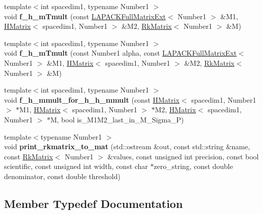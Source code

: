 \begin{DoxyCompactItemize}
\item 
\mbox{\label{classRkMatrix_a439a1469e55ddc97987ee592b920cedb}} 
{\footnotesize template$<$int spacedim1, typename Number1 $>$ }\\void {\bfseries f\+\_\+h\+\_\+m\+Tmult} (const \hyperlink{classLAPACKFullMatrixExt}{L\+A\+P\+A\+C\+K\+Full\+Matrix\+Ext}$<$ Number1 $>$ \&M1, \hyperlink{classHMatrix}{H\+Matrix}$<$ spacedim1, Number1 $>$ \&M2, \hyperlink{classRkMatrix}{Rk\+Matrix}$<$ Number1 $>$ \&M)
\item 
\mbox{\label{classRkMatrix_a7c51795179e7c52726d2eb3a76a17914}} 
{\footnotesize template$<$int spacedim1, typename Number1 $>$ }\\void {\bfseries f\+\_\+h\+\_\+m\+Tmult} (const Number1 alpha, const \hyperlink{classLAPACKFullMatrixExt}{L\+A\+P\+A\+C\+K\+Full\+Matrix\+Ext}$<$ Number1 $>$ \&M1, \hyperlink{classHMatrix}{H\+Matrix}$<$ spacedim1, Number1 $>$ \&M2, \hyperlink{classRkMatrix}{Rk\+Matrix}$<$ Number1 $>$ \&M)
\item 
\mbox{\label{classRkMatrix_a311938523b49a053a8cf16bc96576cdf}} 
{\footnotesize template$<$int spacedim1, typename Number1 $>$ }\\void {\bfseries f\+\_\+h\+\_\+mmult\+\_\+for\+\_\+h\+\_\+h\+\_\+mmult} (const \hyperlink{classHMatrix}{H\+Matrix}$<$ spacedim1, Number1 $>$ $\ast$M1, \hyperlink{classHMatrix}{H\+Matrix}$<$ spacedim1, Number1 $>$ $\ast$M2, \hyperlink{classHMatrix}{H\+Matrix}$<$ spacedim1, Number1 $>$ $\ast$M, bool is\+\_\+\+M1\+M2\+\_\+last\+\_\+in\+\_\+\+M\+\_\+\+Sigma\+\_\+P)
\item 
\mbox{\label{classRkMatrix_a13b3be6d580847d1907db18253e37f05}} 
{\footnotesize template$<$typename Number1 $>$ }\\void {\bfseries print\+\_\+rkmatrix\+\_\+to\+\_\+mat} (std\+::ostream \&out, const std\+::string \&name, const \hyperlink{classRkMatrix}{Rk\+Matrix}$<$ Number1 $>$ \&values, const unsigned int precision, const bool scientific, const unsigned int width, const char $\ast$zero\+\_\+string, const double denominator, const double threshold)
\end{DoxyCompactItemize}


\subsection{Member Typedef Documentation}
\mbox{\label{classRkMatrix_add060bfc3a4cc77f858c3d6dd58cadd5}} 
